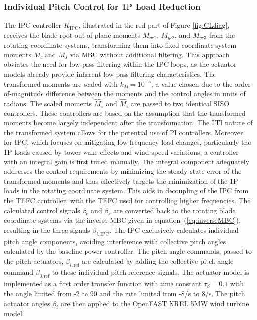 \subsubsection*{Individual Pitch Control for 1P Load Reduction}
The IPC controller $K_{\text{IPC}}$, illustrated in the red part of Figure \ref{fig:CLdiag}, receives the blade root out of plane moments $M_{yc1}$, $M_{yc2}$, and  $M_{yc3}$ from the rotating coordinate systems, transforming them into fixed coordinate system moments $M_c$ and $M_s$ via MBC without additional filtering. This approach obviates the need for low-pass filtering within the IPC loops, as the actuator models already provide inherent low-pass filtering characteristics. The transformed moments are scaled with $k_M = 10^{-5}$, a value chosen due to the order-of-magnitude difference between the moments and the control angles in units of radians. The scaled moments $\hat{M}_s$ and $\hat{M}_c$ are passed to two identical SISO controllers. These controllers are based on the assumption that the transformed moments become largely independent after the transformation. The LTI nature of the transformed system allows for the potential use of PI controllers. Moreover, for IPC, which focuses on mitigating low-frequency load changes, particularly the 1P loads caused by tower wake effects and wind speed variations, a controller with an integral gain is first tuned manually. The integral component adequately addresses the control requirements by minimizing the steady-state error of the transformed moments and thus effectively targets the minimization of the 1P loads in the rotating coordinate system. This aids in decoupling of the IPC from the TEFC controller, with the TEFC used for controlling higher frequencies. The calculated control signals $\beta_c$ and $\beta_s$ are converted back to the rotating blade coordinate systems via the inverse MBC given in equation~(\ref{eq:inverseMBC}), resulting in the three signals $\beta_{i,\text{IPC}}$. The IPC exclusively calculates individual pitch angle components, avoiding interference with collective pitch angles calculated by the baseline power controller. The pitch angle commands, passed to the pitch actuators, $\beta_{i,\text{ref}}$ are calculated by adding the collective pitch angle command $\beta_{0,\text{ref}}$ to these individual pitch reference signals. The actuator model is implemented as a first order transfer function with time constant $\tau_{\beta}=0.1$ with the angle limited from -2\textdegree{} to 90\textdegree{} and the rate limited from -8\textdegree{}/s to 8\textdegree{}/s. The pitch actuator angles $\beta_i$ are then applied to the OpenFAST NREL 5MW wind turbine model.

